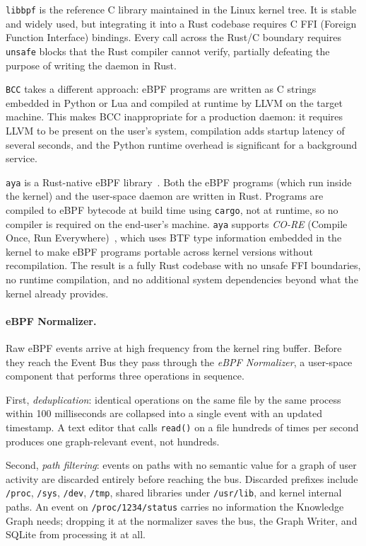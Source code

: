 \texttt{libbpf} is the reference C library maintained in the Linux kernel tree.
It is stable and widely used, but integrating it into a Rust codebase requires
C FFI (Foreign Function Interface) bindings. Every call across the Rust/C
boundary requires \texttt{unsafe} blocks that the Rust compiler cannot verify,
partially defeating the purpose of writing the daemon in Rust.

\texttt{BCC} takes a different approach: eBPF programs are written as C strings
embedded in Python or Lua and compiled at runtime by LLVM on the target machine.
This makes BCC inappropriate for a production daemon: it requires LLVM to be
present on the user's system, compilation adds startup latency of several
seconds, and the Python runtime overhead is significant for a background service.

\texttt{aya} is a Rust-native eBPF library~\cite{aya}. Both the eBPF programs
(which run inside the kernel) and the user-space daemon are written in Rust.
Programs are compiled to eBPF bytecode at build time using \texttt{cargo}, not
at runtime, so no compiler is required on the end-user's machine. \texttt{aya}
supports \emph{CO-RE} (Compile Once, Run Everywhere)~\cite{ebpf:core}, which
uses BTF type information embedded in the kernel to make eBPF programs portable
across kernel versions without recompilation. The result is a fully Rust
codebase with no unsafe FFI boundaries, no runtime compilation, and no
additional system dependencies beyond what the kernel already provides.

\paragraph{eBPF Normalizer.}
Raw eBPF events arrive at high frequency from the kernel ring buffer. Before
they reach the Event Bus they pass through the \emph{eBPF Normalizer}, a
user-space component that performs three operations in sequence.

First, \emph{deduplication}: identical operations on the same file by the same
process within 100 milliseconds are collapsed into a single event with an
updated timestamp. A text editor that calls \texttt{read()} on a file hundreds
of times per second produces one graph-relevant event, not hundreds.

Second, \emph{path filtering}: events on paths with no semantic value for a
graph of user activity are discarded entirely before reaching the bus.
Discarded prefixes include \texttt{/proc}, \texttt{/sys}, \texttt{/dev},
\texttt{/tmp}, shared libraries under \texttt{/usr/lib}, and kernel internal
paths. An event on \texttt{/proc/1234/status} carries no information the
Knowledge Graph needs; dropping it at the normalizer saves the bus, the Graph
Writer, and SQLite from processing it at all.

